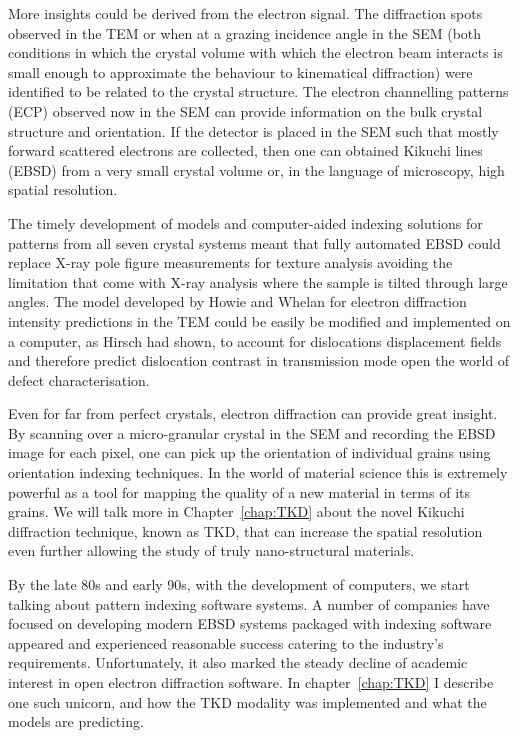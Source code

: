 More insights could be derived from the electron signal. The diffraction spots observed in the TEM or when at a grazing incidence angle in the SEM (both conditions in which the crystal volume with which the electron beam interacts is small enough to approximate the behaviour to kinematical diffraction) were identified to be related to the crystal structure. The electron channelling patterns (ECP) observed now in the SEM can provide  information on the bulk crystal structure and orientation. If the detector is placed in the SEM such that mostly forward scattered electrons are collected, then one can obtained Kikuchi lines (EBSD) from a very small crystal volume or, in the language of microscopy, high spatial resolution.


The timely development of models and computer-aided indexing solutions for patterns from all seven crystal systems meant that fully automated EBSD could replace X-ray pole figure measurements for texture analysis avoiding the limitation that come with X-ray analysis where the sample is tilted through large angles. The model developed by Howie and Whelan for electron diffraction intensity predictions in the TEM could be easily be modified and implemented on a computer, as Hirsch had shown, to account for dislocations displacement fields and therefore predict dislocation contrast in transmission mode open the world of defect characterisation. 


Even for far from perfect crystals, electron diffraction can provide great insight. By scanning over a micro-granular crystal in the SEM and recording the EBSD image for each pixel, one can pick up the orientation of individual grains using orientation indexing techniques. In the world of material science this is extremely powerful as a tool for mapping the quality of a new material in terms of its grains.  We will talk more in Chapter~\ref{chap:TKD} about the novel Kikuchi diffraction technique, known as TKD, that can increase the spatial resolution even further allowing the study of truly nano-structural materials.

By the late 80s and early 90s, with the development of computers,  we start talking about  pattern indexing software systems. A number of companies have focused on developing modern EBSD systems packaged with indexing software appeared and experienced reasonable success catering to the industry's requirements. Unfortunately, it also marked the steady decline of academic interest in open electron diffraction software. In chapter~\ref{chap:TKD} I describe one such unicorn, and how the TKD modality was implemented and what the models are predicting. 


